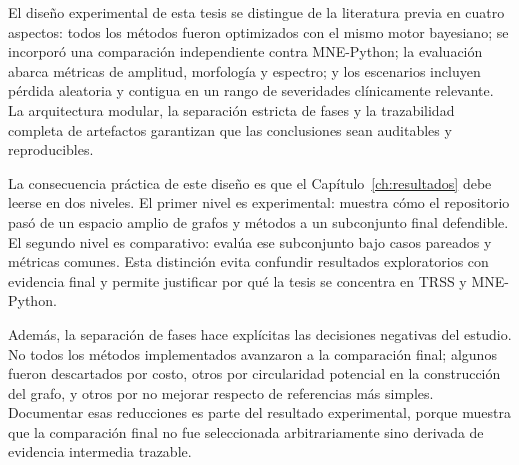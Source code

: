 El diseño experimental de esta tesis se distingue de la literatura previa en cuatro aspectos: todos los métodos fueron optimizados con el mismo motor bayesiano; se incorporó una comparación independiente contra MNE-Python; la evaluación abarca métricas de amplitud, morfología y espectro; y los escenarios incluyen pérdida aleatoria y contigua en un rango de severidades clínicamente relevante. La arquitectura modular, la separación estricta de fases y la trazabilidad completa de artefactos garantizan que las conclusiones sean auditables y reproducibles.

La consecuencia práctica de este diseño es que el Capítulo~\ref{ch:resultados} debe leerse en dos niveles. El primer nivel es experimental: muestra cómo el repositorio pasó de un espacio amplio de grafos y métodos a un subconjunto final defendible. El segundo nivel es comparativo: evalúa ese subconjunto bajo casos pareados y métricas comunes. Esta distinción evita confundir resultados exploratorios con evidencia final y permite justificar por qué la tesis se concentra en TRSS y MNE-Python.

Además, la separación de fases hace explícitas las decisiones negativas del estudio. No todos los métodos implementados avanzaron a la comparación final; algunos fueron descartados por costo, otros por circularidad potencial en la construcción del grafo, y otros por no mejorar respecto de referencias más simples. Documentar esas reducciones es parte del resultado experimental, porque muestra que la comparación final no fue seleccionada arbitrariamente sino derivada de evidencia intermedia trazable.